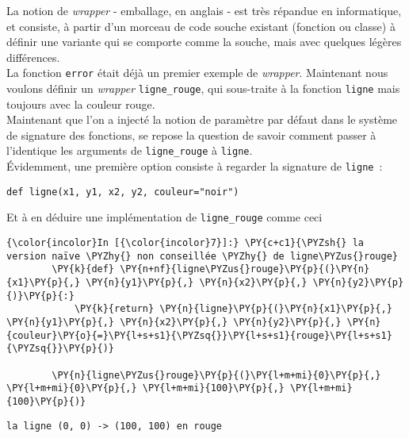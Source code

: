     La notion de \emph{wrapper} - emballage, en anglais - est très répandue
en informatique, et consiste, à partir d'un morceau de code souche
existant (fonction ou classe) à définir une variante qui se comporte
comme la souche, mais avec quelques légères différences.\\

La fonction \texttt{error} était déjà un premier exemple de
\emph{wrapper}. Maintenant nous voulons définir un \emph{wrapper}
\texttt{ligne\_rouge}, qui sous-traite à la fonction \texttt{ligne} mais
toujours avec la couleur rouge.\\

Maintenant que l'on a injecté la notion de paramètre par défaut dans le
système de signature des fonctions, se repose la question de savoir
comment passer à l'identique les arguments de \texttt{ligne\_rouge} à
\texttt{ligne}.\\

    Évidemment, une première option consiste à regarder la signature de
\texttt{ligne}~:

\begin{verbatim}
def ligne(x1, y1, x2, y2, couleur="noir")
\end{verbatim}

    Et à en déduire une implémentation de \texttt{ligne\_rouge} comme ceci

    \begin{Verbatim}[commandchars=\\\{\}]
{\color{incolor}In [{\color{incolor}7}]:} \PY{c+c1}{\PYZsh{} la version naïve \PYZhy{} non conseillée \PYZhy{} de ligne\PYZus{}rouge}
        \PY{k}{def} \PY{n+nf}{ligne\PYZus{}rouge}\PY{p}{(}\PY{n}{x1}\PY{p}{,} \PY{n}{y1}\PY{p}{,} \PY{n}{x2}\PY{p}{,} \PY{n}{y2}\PY{p}{)}\PY{p}{:}
            \PY{k}{return} \PY{n}{ligne}\PY{p}{(}\PY{n}{x1}\PY{p}{,} \PY{n}{y1}\PY{p}{,} \PY{n}{x2}\PY{p}{,} \PY{n}{y2}\PY{p}{,} \PY{n}{couleur}\PY{o}{=}\PY{l+s+s1}{\PYZsq{}}\PY{l+s+s1}{rouge}\PY{l+s+s1}{\PYZsq{}}\PY{p}{)}
        
        \PY{n}{ligne\PYZus{}rouge}\PY{p}{(}\PY{l+m+mi}{0}\PY{p}{,} \PY{l+m+mi}{0}\PY{p}{,} \PY{l+m+mi}{100}\PY{p}{,} \PY{l+m+mi}{100}\PY{p}{)}
\end{Verbatim}


    \begin{Verbatim}[commandchars=\\\{\}]
la ligne (0, 0) -> (100, 100) en rouge

    \end{Verbatim}

